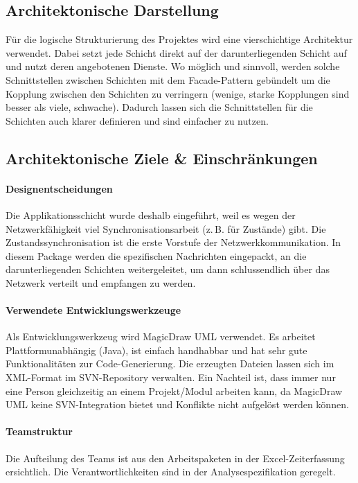 \documentclass[a4paper,12pt,halfparskip,DIV14]{scrartcl}
\begin{document}
\subsection{Architektonische Darstellung} %
\label{sub:architektonische_darstellung}
Für die logische Strukturierung des Projektes wird eine vierschichtige Architektur verwendet. Dabei setzt jede Schicht direkt auf der darunterliegenden Schicht auf und nutzt deren angebotenen Dienste. Wo möglich und sinnvoll, werden solche Schnittstellen zwischen Schichten mit dem Facade-Pattern gebündelt um die Kopplung zwischen den Schichten zu verringern (wenige, starke Kopplungen sind besser als viele, schwache). Dadurch lassen sich die Schnittstellen für die Schichten auch klarer definieren und sind einfacher zu nutzen.

\subsection{Architektonische Ziele \& Einschränkungen} %
\label{sub:architektonische_ziele_einschraenkungen}
\paragraph{Designentscheidungen}\label{ssub:designentscheidungen} %
Die Applikationsschicht wurde deshalb eingeführt, weil es wegen der Netzwerkfähigkeit viel Synchronisationsarbeit (z.\,B. für Zustände) gibt. Die Zustandssynchronisation ist die erste Vorstufe der Netzwerkkommunikation. In diesem Package werden die spezifischen Nachrichten eingepackt, an die darunterliegenden Schichten weitergeleitet, um dann schlussendlich über das Netzwerk verteilt und empfangen zu werden.
\paragraph{Verwendete Entwicklungswerkzeuge}\label{ssub:verwendete_entwicklungswerkzeuge} %
Als Entwicklungswerkzeug wird MagicDraw UML verwendet. Es arbeitet Plattformunabhängig (Java), ist einfach handhabbar und hat sehr gute Funktionalitäten zur Code-Generierung. Die erzeugten Dateien lassen sich im XML-Format im SVN-Repository verwalten. Ein Nachteil ist, dass immer nur eine Person gleichzeitig an einem Projekt/Modul arbeiten kann, da MagicDraw UML keine SVN-Integration bietet und Konflikte nicht aufgelöst werden können.
\paragraph{Teamstruktur}\label{ssub:teamstruktur} %
Die Aufteilung des Teams ist aus den Arbeitspaketen in der Excel-Zeiterfassung ersichtlich. Die Verantwortlichkeiten sind in der Analysespezifikation geregelt.
\end{document}
